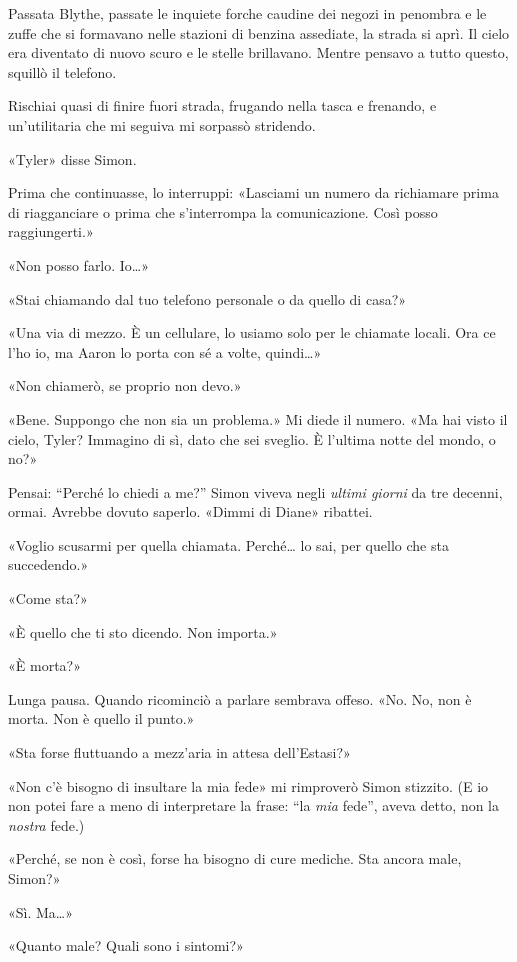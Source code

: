Passata Blythe, passate le inquiete forche caudine dei negozi in
penombra e le zuffe che si formavano nelle stazioni di benzina
assediate, la strada si aprì. Il cielo era diventato di nuovo scuro e le
stelle brillavano. Mentre pensavo a tutto questo, squillò il telefono.

Rischiai quasi di finire fuori strada, frugando nella tasca e frenando,
e un'utilitaria che mi seguiva mi sorpassò stridendo.

«Tyler» disse Simon.

Prima che continuasse, lo interruppi: «Lasciami un numero da richiamare
prima di riagganciare o prima che s'interrompa la comunicazione. Così
posso raggiungerti.»

«Non posso farlo. Io\ldots»

«Stai chiamando dal tuo telefono personale o da quello di casa?»

«Una via di mezzo. È un cellulare, lo usiamo solo per le chiamate
locali. Ora ce l'ho io, ma Aaron lo porta con sé a volte, quindi\ldots»

«Non chiamerò, se proprio non devo.»

«Bene. Suppongo che non sia un problema.» Mi diede il numero. «Ma hai
visto il cielo, Tyler? Immagino di sì, dato che sei sveglio. È l'ultima
notte del mondo, o no?»

Pensai: ``Perché lo chiedi a me?'' Simon viveva negli \emph{ultimi
	giorni} da tre decenni, ormai. Avrebbe dovuto saperlo. «Dimmi di Diane»
ribattei.

«Voglio scusarmi per quella chiamata. Perché\ldots{} lo sai, per quello
che sta succedendo.»

«Come sta?»

«È quello che ti sto dicendo. Non importa.»

«È morta?»

Lunga pausa. Quando ricominciò a parlare sembrava offeso. «No. No, non è
morta. Non è quello il punto.»

«Sta forse fluttuando a mezz'aria in attesa dell'Estasi?»

«Non c'è bisogno di insultare la mia fede» mi rimproverò Simon stizzito.
(E io non potei fare a meno di interpretare la frase: ``la \emph{mia}
fede'', aveva detto, non la \emph{nostra} fede.)

«Perché, se non è così, forse ha bisogno di cure mediche. Sta ancora
male, Simon?»

«Sì. Ma\ldots»

«Quanto male? Quali sono i sintomi?»


